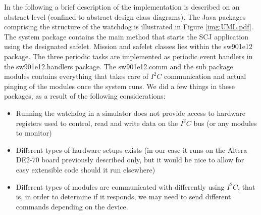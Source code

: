 In the following a brief description of the implementation is described on an abstract level (confined to abstract design class diagrams). The Java packages comprising the structure of the watchdog is illustrated in Figure \ref{img:UML.pdf}. 
The system package contains the main method that starts the SCJ application using the designated safelet. Mission and safelet classes lies within the sw901e12 package. The three periodic tasks are implemented as periodic event handlers in the sw901e12.handlers package.
The sw901e12.comm and the sub package modules contains everything that takes care of $\textit{I}^2\textit{C}$ communication and actual pinging of the modules once the system runs. We did a few things in these packages, as a result of the following considerations:
\begin{itemize}
    \item Running the watchdog in a simulator does not provide access to hardware registers used to control, read and write data on the $\textit{I}^2\textit{C}$ bus (or any modules to monitor)
    \item Different types of hardware setups exists (in our case it runs on the Altera DE2-70 board previously described only, but it would be nice to allow for easy extensible code should it run elsewhere)
    \item Different types of modules are communicated with differently using $\textit{I}^2\textit{C}$, that is, in order to determine if it responds, we may need to send different commands depending on the device.
\end{itemize}

